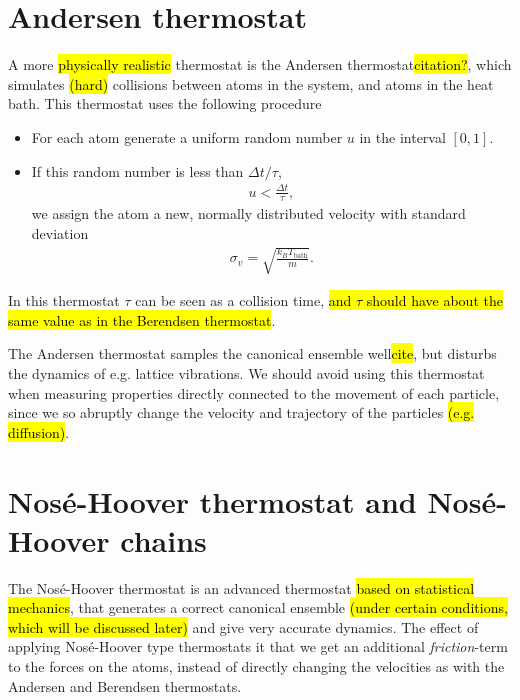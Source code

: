 \section{Andersen thermostat}
A more \hl{physically realistic} thermostat is the Andersen thermostat\hl{citation?}, which simulates \hl{(hard)} collisions between atoms in the system, and atoms in the heat bath. This thermostat uses the following procedure
%
\begin{itemize}
    \item For each atom generate a uniform random number $u$ in the interval $[0,1]$.
    \item If this random number is less than $\Delta t/\tau$,
        \begin{align*}
            u < \frac{\Delta t}{\tau},
        \end{align*}
        we assign the atom a new, normally distributed velocity with standard deviation
        \begin{align*}
            \sigma_v = \sqrt{\frac{k_B T_\text{bath}}{m}}.
        \end{align*}
\end{itemize}
%
In this thermostat $\tau$ can be seen as a collision time, \hl{and $\tau$ should have about the same value as in the Berendsen thermostat}.

The Andersen thermostat samples the canonical ensemble well\hl{cite}, but disturbs the dynamics of e.g. lattice vibrations. We should avoid using this thermostat when measuring properties directly connected to the movement of each particle, since we so abruptly change the velocity and trajectory of the particles \hl{(e.g. diffusion)}.

\section{Nos\'e-Hoover thermostat and Nos\'e-Hoover chains}
The Nos\'e-Hoover thermostat is an advanced thermostat \hl{based on statistical mechanics}, that generates a correct canonical ensemble \hl{(under certain conditions, which will be discussed later)} and give very accurate dynamics\cite[section 6.1]{frenkel2001understanding}. The effect of applying Nosé-Hoover type thermostats it that we get an additional \emph{friction}-term to the forces on the atoms, instead of directly changing the velocities as with the Andersen and Berendsen thermostats.

